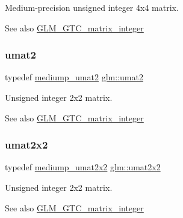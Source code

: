 Medium-\/precision unsigned integer 4x4 matrix. \begin{DoxySeeAlso}{See also}
\hyperlink{group__gtc__matrix__integer}{G\+L\+M\+\_\+\+G\+T\+C\+\_\+matrix\+\_\+integer} 
\end{DoxySeeAlso}
\mbox{\label{group__gtc__matrix__integer_gae2d45c058cfa0b60ab4df0cdda2d8516}} 
\subsubsection{\texorpdfstring{umat2}{umat2}}
{\footnotesize\ttfamily typedef \hyperlink{group__gtc__matrix__integer_ga85bc35173415dba31bb964c2940feeec}{mediump\+\_\+umat2} \hyperlink{group__gtc__matrix__integer_gae2d45c058cfa0b60ab4df0cdda2d8516}{glm\+::umat2}}

Unsigned integer 2x2 matrix. \begin{DoxySeeAlso}{See also}
\hyperlink{group__gtc__matrix__integer}{G\+L\+M\+\_\+\+G\+T\+C\+\_\+matrix\+\_\+integer} 
\end{DoxySeeAlso}
\mbox{\label{group__gtc__matrix__integer_gad3c997b31dd69bdb4787867e758ed48d}} 
\subsubsection{\texorpdfstring{umat2x2}{umat2x2}}
{\footnotesize\ttfamily typedef \hyperlink{group__gtc__matrix__integer_gafce8777b8b0d9d7f810853b22de3be1b}{mediump\+\_\+umat2x2} \hyperlink{group__gtc__matrix__integer_gad3c997b31dd69bdb4787867e758ed48d}{glm\+::umat2x2}}

Unsigned integer 2x2 matrix. \begin{DoxySeeAlso}{See also}
\hyperlink{group__gtc__matrix__integer}{G\+L\+M\+\_\+\+G\+T\+C\+\_\+matrix\+\_\+integer} 
\end{DoxySeeAlso}
\mbox{\label{group__gtc__matrix__integer_ga890ae28f9230794138b2c89f44ce3376}} 
